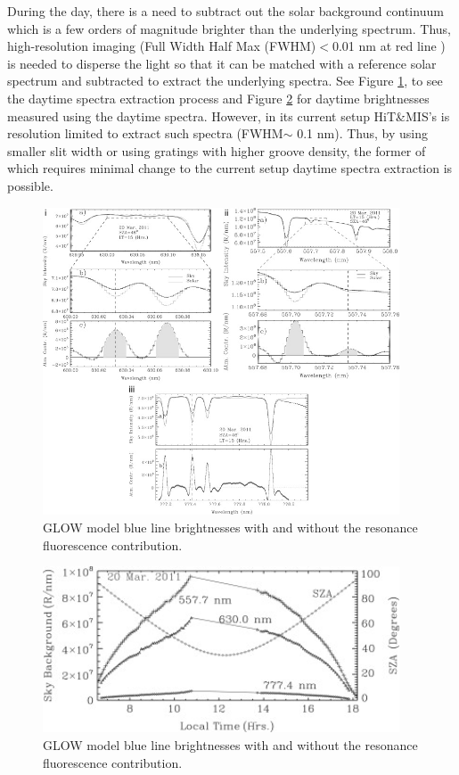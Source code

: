 \documentclass[crop=false,class=mitthesis,oneside,font=12pt]{standalone}
\begin{document}
During the day, there is a need to subtract out the solar background continuum which is a few orders of magnitude brighter than the underlying spectrum. Thus, high-resolution imaging (Full Width Half Max (FWHM)$<$0.01 nm at red line \citep{hitmis}) is needed to disperse the light so that it can be matched with a reference solar spectrum and subtracted to extract the underlying spectra. See Figure \ref{fig:mise}, to see the daytime spectra extraction process and Figure \ref{fig:mise_b} for daytime brightnesses measured using the daytime spectra. However, in its current setup HiT\&MIS's is resolution limited to extract such spectra (FWHM$\sim$ 0.1 nm). Thus, by using smaller slit width or using gratings with higher groove density, the former of which requires minimal change to the current setup daytime spectra extraction is possible. 
\begin{figure}[H]
	\centering\includegraphics[width=25pc]{mise_day.jpg}
	\caption{GLOW model blue line brightnesses with and without the resonance fluorescence contribution.}
	\label{fig:mise}
\end{figure}
\begin{figure}[H]
	\centering\includegraphics[width=25pc]{mise_brg.jpg}
	\caption{GLOW model blue line brightnesses with and without the resonance fluorescence contribution.}
	\label{fig:mise_b}
\end{figure}
\end{document}
